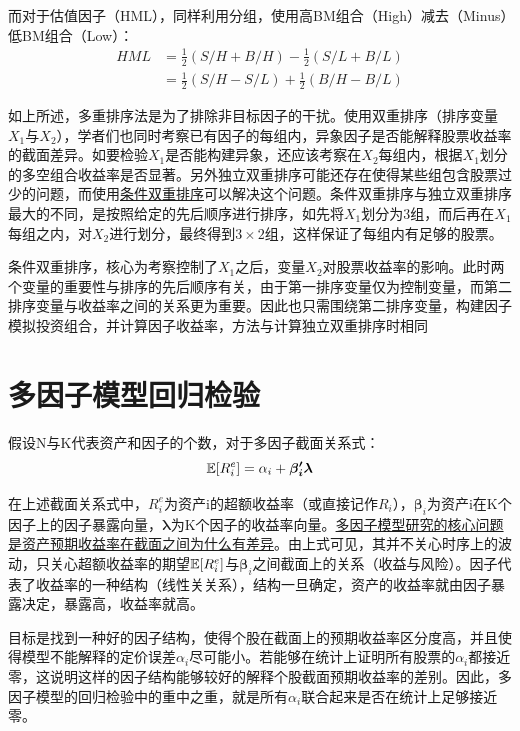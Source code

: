 \documentclass[11pt]{article}
\begin{document}
而对于估值因子（HML），同样利用分组，使用高BM组合（High）减去（Minus）低BM组合（Low）：
\begin{align*}
    HML &=  \frac{1}{2}(S/H + B/H) - \frac{1}{2}(S/L + B/L) \\
    &= \frac{1}{2}(S/H-S/L) + \frac{1}{2}(B/H-B/L)
\end{align*}

如上所述，多重排序法是为了排除非目标因子的干扰。使用双重排序（排序变量$X_1$与$X_2$），学者们也同时考察已有因子的每组内，异象因子是否能解释股票收益率的截面差异。如要检验$X_1$是否能构建异象，还应该考察在$X_2$每组内，根据$X_1$划分的多空组合收益率是否显著。另外独立双重排序可能还存在使得某些组包含股票过少的问题，而使用\uline{条件双重排序}可以解决这个问题。条件双重排序与独立双重排序最大的不同，是按照给定的先后顺序进行排序，如先将$X_1$划分为3组，而后再在$X_1$每组之内，对$X_2$进行划分，最终得到$3\times 2$组，这样保证了每组内有足够的股票。

条件双重排序，核心为考察控制了$X_1$之后，变量$X_2$对股票收益率的影响。此时两个变量的重要性与排序的先后顺序有关，由于第一排序变量仅为控制变量，而第二排序变量与收益率之间的关系更为重要。因此也只需围绕第二排序变量，构建因子模拟投资组合，并计算因子收益率，方法与计算独立双重排序时相同

\section{多因子模型回归检验}

假设N与K代表资产和因子的个数，对于多因子截面关系式：
\begin{equation*}
    \mathbb{E}[R_{i}^{e}] = \alpha_i + \bm{\beta_{i}' \lambda}
\end{equation*}

在上述截面关系式中，$R_{i}^{e}$为资产i的超额收益率（或直接记作$R_{i}$），$\bm{\beta}_i$为资产i在K个因子上的因子暴露向量，$\bm{\lambda}$为K个因子的收益率向量。\uline{多因子模型研究的核心问题是资产预期收益率在截面之间为什么有差异}。由上式可见，其并不关心时序上的波动，只关心超额收益率的期望$\mathbb{E}[R_{i}^{e}]$与$\bm{\beta}_i$之间截面上的关系（收益与风险）。因子代表了收益率的一种结构（线性关关系），结构一旦确定，资产的收益率就由因子暴露决定，暴露高，收益率就高。

目标是找到一种好的因子结构，使得个股在截面上的预期收益率区分度高，并且使得模型不能解释的定价误差$\alpha_i$尽可能小。若能够在统计上证明所有股票的$\alpha_i$都接近零，这说明这样的因子结构能够较好的解释个股截面预期收益率的差别。因此，多因子模型的回归检验中的重中之重，就是所有$\alpha_i$联合起来是否在统计上足够接近零。
\end{document}
